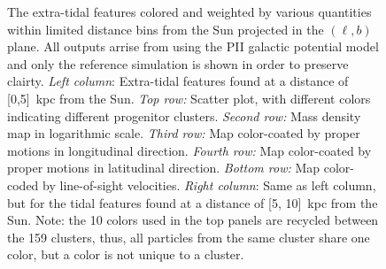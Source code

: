 \begin{figure}[h!]
        \caption[The extra-tidal features colored and weighted by various quantities within limited distance bins from the Sun projected in the $(\ell, b)$ plane.]{The extra-tidal features colored and weighted by various quantities within limited distance bins from the Sun projected in the $(\ell, b)$ plane. All outputs arrise from using the PII galactic potential model and only the reference simulation is shown in order to preserve clairty. \emph{Left column}: Extra-tidal features found at a distance of [0,5]~kpc from the Sun. \emph{Top row:} Scatter plot, with different colors indicating different progenitor clusters. \emph{Second row:} Mass density map in logarithmic scale. \emph{Third row:} Map color-coated by proper motions in longitudinal direction.    \emph{Fourth row:} Map color-coated by proper motions in latitudinal direction.  \emph{Bottom row:} Map color-coded by line-of-sight velocities. \emph{Right column}: Same as left column, but for the tidal features found at a distance of [5, 10]~kpc from the Sun. Note: the 10 colors used in the top panels are recycled between the 159 clusters, thus, all particles from the same cluster share one color, but a color is not unique to a cluster. }\label{D0-10}
    \end{figure}
    \onecolumn

